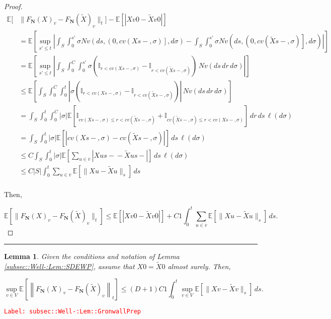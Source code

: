 \documentclass[12pt]{article}
\newcommand{\mb}{\mathbb}
\newcommand{\ov}{\overline}
\newcommand{\tr}{\textcolor{red}}
\newcommand{\labe}[1]{\tr{\texttt{Label: #1}}}
\newcommand{\lin}{\rule{\linewidth}{0.4 pt}}
\newcommand{\ex}[1]{\mb{E}\left[#1\right]}			%
\renewcommand{\v}{v}							%
\newcommand{\vv}{u}								%
\renewcommand{\S}{S}							%
\newcommand{\s}{\sigma}							%
\renewcommand{\t}{t}							%
\renewcommand{\tt}{s}							%
\newcommand{\ttt}{s'}							%
\newcommand{\X}{X}								%
\newcommand{\IGr}{c}							%
\newcommand{\cl}{\ov}							%
\newcommand{\const}{C}							%
\newcommand{\degr}{D}							%
\newcommand{\poisses}{\mathbf{N}}				%
\newcommand{\poiss}{N}							%
\newcommand{\Sm}{\ell}							%
\newcommand{\Fpo}{F_{\poisses}}					%
\renewcommand{\r}{r}							%
\newcommand{\alt}[1]{\widetilde{#1}}			%
\newtheorem{lem}[thms]{Lemma}
\begin{document}
\begin{proof}
\begin{align*}
\mb{E}\bigg[&\|\Fpo(\X{}{})_\v - \Fpo(\alt{\X})_\v\|_\t\bigg] - \ex{|\X{\v}{0} - \alt{\X}{\v}{0}|}\\
&= \ex{\sup_{\ttt \leq \t}\left|\int_\S\int_0^{\ttt} \s\poiss{\v}\left(d\tt,\left(0,\IGr{\v}(\X{}{\tt-},\s)\right],d\s\right) -  \int_\S\int_0^{\ttt} \s\poiss{\v}\left(d\tt,\left(0,\IGr{\v}(\alt{\X}{}{\tt-},\s)\right],d\s\right)\right|}\\
&=\ex{\sup_{\ttt\leq \t} \left|\int_\S \int_0^{\const{}} \int_0^{\ttt} \s\left(\mb{I}_{\r < \IGr{\v}(\X{}{\tt-},\s)} - \mb{I}_{\r < \IGr{\v}(\alt{\X}{}{\tt-},\s)}\right)\,\poiss{\v}(d\tt\,d\r\,d\s)\right|}\\
&\leq \ex{\int_\S\int_0^{\const{}}\int_0^\t \left|\s\left(\mb{I}_{\r < \IGr{\v}(\X{}{\tt-},\s)} - \mb{I}_{\r < \IGr{\v}(\alt{\X}{}{\tt-},\s)}\right)\right|\,\poiss{\v}(d\tt\,d\r\,d\s)}\\
&=\int_\S\int_0^\t\int_0^{\const{}} |\s|\ex{\mb{I}_{\IGr{\v}(\X{}{\tt-},\s) \leq \r < \IGr{\v}(\alt{\X}{}{\tt-},\s)} + \mb{I}_{\IGr{\v}(\alt{\X}{}{\tt-},\s) \leq \r < \IGr{\v}(\X{}{\tt-},\s)}}\,d\r\,d\tt\,\Sm(d\s)\\
&= \int_\S\int_0^\t|\s|\ex{\left|\IGr{\v}(\X{}{\tt-},\s) - \IGr{\v}(\alt{\X}{}{\tt-},\s)\right|}\,d\tt\,\Sm(d\s)\\
&\leq \const{}\int_\S\int_0^\t |\s| \ex{\sum_{\vv \in \cl{\v}}|\X{\vv}{\tt-} - \alt{\X}{\vv}{\tt-}|}\,d\tt\,\Sm(d\s)\\
&\leq \const{}|\S|\int_0^\t \sum_{\vv \in \cl{\v}}\ex{\|\X{\vv}{} - \alt{\X}{\vv}\|_\tt}\,d\tt\\
\end{align*}

Then,

\[\ex{\|\Fpo(\X{}{})_\v - \Fpo(\alt{\X})_\v\|_\t} \leq \ex{|\X{\v}{0} - \alt{\X}{\v}{0}|} +  \const{1}\int_0^\t \sum_{\vv\in \cl{\v}} \ex{\|\X{\vv}{} - \alt{\X}{\vv}\|_\tt}\,d\tt.\]

\end{proof}

\lin

\begin{lem}
Given the conditions and notation of Lemma \ref{subsec::Well-:Lem::SDEWP}, assume that \(\X{}{0} = \alt{\X}{{}{0}}\) almost surely. Then,

\[\sup_{\v \in  V} \ex{\left\|\Fpo(\X{}{})_\v - \Fpo(\alt{\X}{{}{}})_\v\right\|_\t} \leq (\degr+1)\const{1}\int_0^\t \sup_{\v \in  V} \ex{\|\X{\v}{} - \alt{\X}{{\v}{}}\|_\tt}\,d\tt.\]
\label{subsec::Well-:Lem::GronwallPrep}
\end{lem}
\labe{subsec::Well-:Lem::GronwallPrep}
\end{document}
